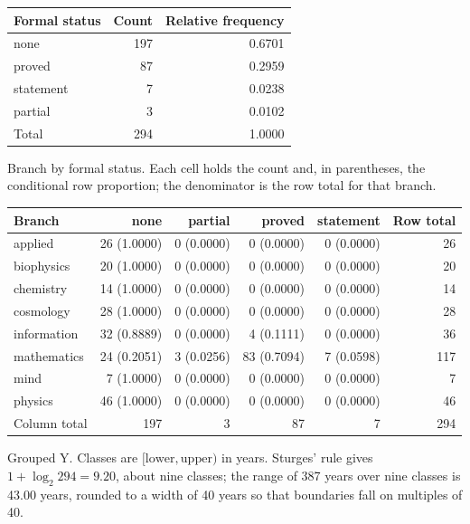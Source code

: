\documentclass[11pt]{article}
\begin{document}
\begin{center}\begin{tabular}{lrr}
\toprule
Formal status & Count & Relative frequency \\
\midrule
none & 197 & 0.6701 \\
proved & 87 & 0.2959 \\
statement & 7 & 0.0238 \\
partial & 3 & 0.0102 \\
Total & 294 & 1.0000 \\
\bottomrule
\end{tabular}\end{center}

Branch by formal status. Each cell holds the count and, in parentheses, the conditional row proportion; the denominator is the row total for that branch.

\begin{center}\begin{tabular}{lrrrrr}
\toprule
Branch & none & partial & proved & statement & Row total \\
\midrule
applied & 26 (1.0000) & 0 (0.0000) & 0 (0.0000) & 0 (0.0000) & 26 \\
biophysics & 20 (1.0000) & 0 (0.0000) & 0 (0.0000) & 0 (0.0000) & 20 \\
chemistry & 14 (1.0000) & 0 (0.0000) & 0 (0.0000) & 0 (0.0000) & 14 \\
cosmology & 28 (1.0000) & 0 (0.0000) & 0 (0.0000) & 0 (0.0000) & 28 \\
information & 32 (0.8889) & 0 (0.0000) & 4 (0.1111) & 0 (0.0000) & 36 \\
mathematics & 24 (0.2051) & 3 (0.0256) & 83 (0.7094) & 7 (0.0598) & 117 \\
mind & 7 (1.0000) & 0 (0.0000) & 0 (0.0000) & 0 (0.0000) & 7 \\
physics & 46 (1.0000) & 0 (0.0000) & 0 (0.0000) & 0 (0.0000) & 46 \\
Column total & 197 & 3 & 87 & 7 & 294 \\
\bottomrule
\end{tabular}\end{center}

Grouped Y. Classes are $[\text{lower}, \text{upper})$ in years. Sturges' rule gives $1 + \log_2 294 = 9.20$, about nine classes; the range of 387 years over nine classes is 43.00 years, rounded to a width of 40 years so that boundaries fall on multiples of 40.
\end{document}
